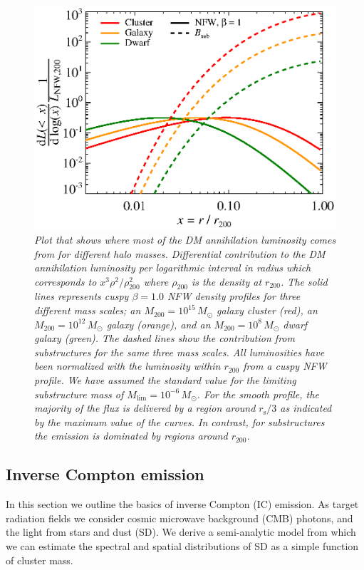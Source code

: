 \documentclass[10pt,aps,pra,reprint,amsmath,amsfonts,amssymb,showpacs,nofootinbib,floatfix]{revtex4-1}
\newcommand{\rmn}{\mathrm}
\newcommand{\msun}{M_\odot}
\newcommand{\s}{\rmn{s}}
\newcommand{\rvir}{r_{200}}
\newcommand{\mvir}{M_{200}}
\begin{document}
\begin{figure}
  \includegraphics[width=0.99\columnwidth]{figures/emissiv.sub.eps}
  \caption{\it Plot that shows where most of the DM annihilation
    luminosity comes from for different halo masses.  Differential
    contribution to the DM annihilation luminosity per logarithmic
    interval in radius which corresponds to $x^3\rho^2/\rho^2_{200}$
    where $\rho_{200}$ is the density at $\rvir$. The solid lines
    represents cuspy $\beta=1.0$ NFW density profiles for three
    different mass scales; an $\mvir=10^{15}\,\msun$ galaxy cluster
    (red), an $\mvir=10^{12}\,\msun$ galaxy (orange), and an
    $\mvir=10^{8}\,\msun$ dwarf galaxy (green). The dashed lines show
    the contribution from substructures for the same three mass
    scales. All luminosities have been normalized with the luminosity
    within $\rvir$ from a cuspy NFW profile. We have assumed the
    standard value for the limiting substructure mass of
    $M_\rmn{lim}=10^{-6}\,\msun$. For the smooth profile, the majority
    of the flux is delivered by a region around $r_\s/3$ as indicated
    by the maximum value of the curves. In contrast, for substructures
    the emission is dominated by regions around $r_{200}$.}
  \label{fig:radial_emis}
\end{figure}


\subsection{Inverse Compton emission}
\label{sect:IC}

In this section we outline the basics of inverse Compton (IC)
emission. As target radiation fields we consider  cosmic microwave
background (CMB) photons, and the light from stars and dust (SD). We
derive a semi-analytic model from which we can estimate the spectral
and spatial distributions of SD as a simple function of cluster mass.
\end{document}
